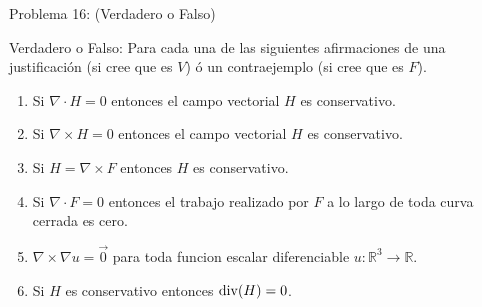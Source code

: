 \documentclass[usepdftitle=false]{beamer}
\begin{document}
\begin{frame}{Problema 16: (Verdadero o Falso)}

Verdadero o Falso: Para cada una de las siguientes afirmaciones de una justificaci\'on (si cree que es $V$) \'o un contraejemplo (si cree que es $F$).

\begin{enumerate}
\item Si $\nabla\cdot H=0$ entonces el campo vectorial $H$ es conservativo.
\item Si $\nabla\times H=0$ entonces el campo vectorial $H$ es conservativo.
\item Si $H=\nabla \times F$ entonces $H$ es conservativo.
\item Si $\nabla\cdot F=0$ entonces el trabajo realizado por $F$ a lo largo de toda curva cerrada es cero.
\item $\nabla \times \nabla u=\vec{0}$ para 
toda funcion escalar diferenciable $u:\mathbb{R}^3\rightarrow \mathbb{R}$.
\item Si $H$ es conservativo entonces ${\rm div}(H)=0$.
\end{enumerate}

\end{frame}
\end{document}
